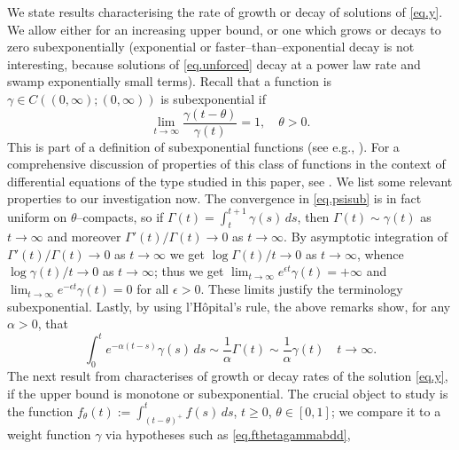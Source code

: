 \documentclass[a4paper,10pt,reqno]{amsart}
\numberwithin{equation}{section}
\theoremstyle{definition}
\theoremstyle{remark}
\DeclareMathOperator{\1}{\mathbbm 1}
\begin{document}
	We state results characterising the rate of growth or decay of solutions of \eqref{eq.y}. We allow either for an increasing upper bound, or one which grows or decays to zero subexponentially 
	(exponential or faster--than--exponential decay is not interesting, because solutions of \eqref{eq.unforced}  decay at a power law rate and swamp exponentially small terms).  
	Recall that a function is $\gamma\in C((0,\infty);(0,\infty))$ is subexponential if 
	\begin{equation} \label{eq.psisub}
		\lim_{t\to\infty} \frac{\gamma(t-\theta)}{\gamma(t)}=1, \quad\theta>0.
	\end{equation}
	This is part of a definition of subexponential functions (see e.g., \cite{BGT}). For a comprehensive discussion of properties of this class of functions in the context of differential equations of the type studied in this paper, see \cite{AppLaw2024ODE}. We list some relevant properties to our investigation now. 
	The convergence in \eqref{eq.psisub} is in fact uniform on $\theta$--compacts, so if $\Gamma(t)=\int_{t}^{t+1} \gamma(s)\,ds$, then $\Gamma(t)\sim \gamma(t)$ as $t\to\infty$ and moreover $\Gamma'(t)/\Gamma(t)\to 0$ as $t\to\infty$. By asymptotic integration of $\Gamma'(t)/\Gamma(t)\to 0$ as $t\to\infty$ we get $\log \Gamma(t)/t\to 0$ as $t\to\infty$, whence $\log \gamma(t)/t\to 0$ as $t\to\infty$; thus we get
	$\lim_{t\to\infty} e^{\epsilon t} \gamma(t)=+\infty$ and 
	$\lim_{t\to\infty} e^{-\epsilon t} \gamma(t)=0$ for all $\epsilon>0$. These limits justify the terminology subexponential. 
	Lastly, by using l'H\^opital's rule, the above remarks show,  for any $\alpha>0$, that  
	\begin{equation} \label{eq.subconvexp}
		\int_0^t e^{-\alpha(t-s)}\gamma(s)\,ds \sim \frac{1}{\alpha}\Gamma(t)\sim \frac{1}{\alpha}\gamma(t) \quad t\to \infty.
	\end{equation}
	The next result from \cite{AppLaw2024ODE} characterises of growth or decay rates of the solution \eqref{eq.y}, if the upper bound is monotone or subexponential. The crucial object to study is the function $f_\theta(t):=\int_{(t-\theta)^+}^t f(s)\,ds$, $t\geq 0$, $\theta\in [0,1]$; we compare it to a weight function $\gamma$ via hypotheses such as \eqref{eq.fthetagammabdd},  
\end{document}
